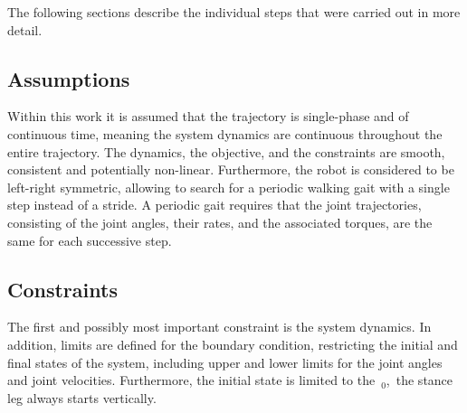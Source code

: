     The following sections describe the individual steps that were carried out in more detail.

        \subsection*{Assumptions}
        
        Within this work it is assumed that the trajectory is single-phase and of continuous time, meaning the system dynamics are continuous throughout the entire trajectory. The dynamics, the objective, and the constraints are smooth, consistent and potentially non-linear. Furthermore, the robot is considered to be left-right symmetric, allowing to search for a periodic walking gait with a single step instead of a stride. A periodic gait requires that the joint trajectories, consisting of the joint angles, their rates, and the associated torques, are the same for each successive step.~\cite{Kelly2017}
        
        \subsection*{Constraints}
        
        The first and possibly most important constraint is the system dynamics. In addition, limits are defined for the boundary condition, restricting the initial and final states of the system, including upper and lower limits for the joint angles and joint velocities. Furthermore, the initial state is limited to the~$_0$,~\ie the stance leg always starts vertically. %
        
        

